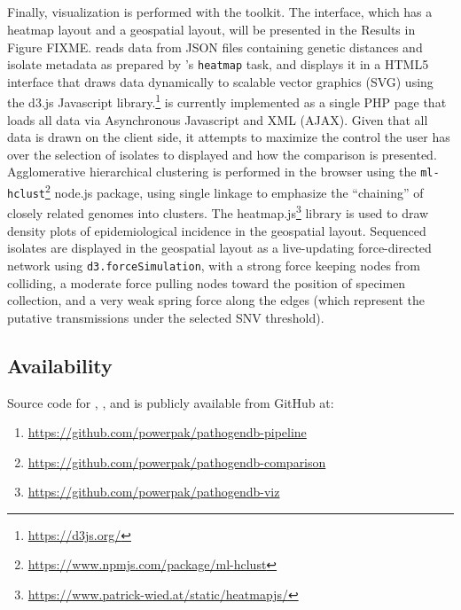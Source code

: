 \subsection{\pathogendbviz}

Finally, visualization is performed with the \pathogendbviz{} toolkit. The interface, which has a heatmap layout and a geospatial layout, will be presented in the Results in Figure FIXME. \pathogendbviz{} reads data from JSON files containing genetic distances and isolate metadata as prepared by \pathogendbcomparison{}'s \verb|heatmap| task, and displays it in a HTML5 interface that draws data dynamically to scalable vector graphics (SVG) using the d3.js Javascript library.\footnote{\url{https://d3js.org/}} \pathogendbviz{} is currently implemented as a single PHP page that loads all data via Asynchronous Javascript and XML (AJAX).\autocite{Paulson2005} Given that all data is drawn on the client side, it attempts to maximize the control the user has over the selection of isolates to displayed and how the comparison is presented. Agglomerative hierarchical clustering is performed in the browser using the \texttt{ml-hclust}\footnote{\url{https://www.npmjs.com/package/ml-hclust}} node.js package, using single linkage to emphasize the ``chaining'' of closely related genomes into clusters. The heatmap.js\footnote{\url{https://www.patrick-wied.at/static/heatmapjs/}} library is used to draw density plots of epidemiological incidence in the geospatial layout. Sequenced isolates are displayed in the geospatial layout as a live-updating force-directed network using \texttt{d3.forceSimulation}, with a strong force keeping nodes from colliding, a moderate force pulling nodes toward the position of specimen collection, and a very weak spring force along the edges (which represent the putative transmissions under the selected SNV threshold).

\subsection{Availability}

Source code for \pathogendbpipeline, \pathogendbcomparison, and \pathogendbviz{} is publicly available from GitHub at:

\begin{enumerate}[label=\arabic*.,noitemsep,labelindent=2em,leftmargin=!]
\item \url{https://github.com/powerpak/pathogendb-pipeline}
\item \url{https://github.com/powerpak/pathogendb-comparison}
\item \url{https://github.com/powerpak/pathogendb-viz}
\end{enumerate}

